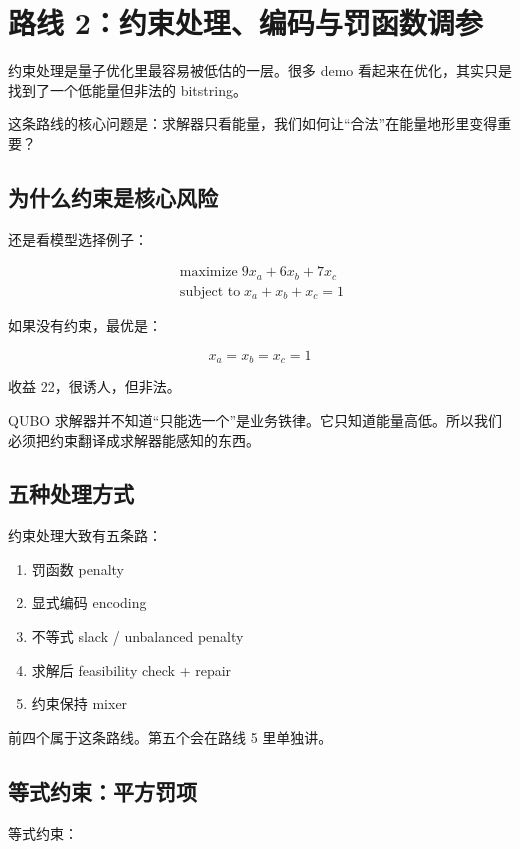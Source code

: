 \documentclass[UTF8,12pt,a4paper]{ctexart}
\begin{document}
\section*{路线 2：约束处理、编码与罚函数调参}

约束处理是量子优化里最容易被低估的一层。很多 demo 看起来在优化，其实只是找到了一个低能量但非法的 bitstring。

这条路线的核心问题是：求解器只看能量，我们如何让“合法”在能量地形里变得重要？

\subsection*{为什么约束是核心风险}

还是看模型选择例子：

\[
\begin{aligned}
\operatorname*{maximize} 9 x_{a} + 6 x_{b} + 7 x_{c}\\
\operatorname*{subject\ to} x_{a} + x_{b} + x_{c} = 1
\end{aligned}
\]

如果没有约束，最优是：

\[
x_{a} = x_{b} = x_{c} = 1
\]

收益 22，很诱人，但非法。

QUBO 求解器并不知道“只能选一个”是业务铁律。它只知道能量高低。所以我们必须把约束翻译成求解器能感知的东西。

\subsection*{五种处理方式}

约束处理大致有五条路：

\begin{enumerate}
\item 罚函数 penalty
\item 显式编码 encoding
\item 不等式 slack / unbalanced penalty
\item 求解后 feasibility check + repair
\item 约束保持 mixer
\end{enumerate}

前四个属于这条路线。第五个会在路线 5 里单独讲。

\subsection*{等式约束：平方罚项}

等式约束：
\end{document}
